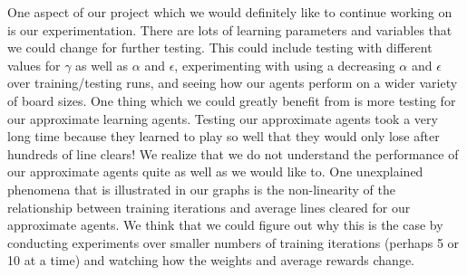 \documentclass[10pt]{article}
\begin{document}
\bigskip

One aspect of our project which we would definitely like to continue working on is our experimentation. There are lots of learning parameters and variables that we could change for further testing. This could include testing with different values for $\gamma$ as well as $\alpha$ and $\epsilon$, experimenting with using a decreasing $\alpha$ and $\epsilon$ over training/testing runs, and seeing how our agents perform on a wider variety of board sizes. One thing which we could greatly benefit from is more testing for our approximate learning agents. Testing our approximate agents took a very long time because they learned to play so well that they would only lose after hundreds of line clears! We realize that we do not understand the performance of our approximate agents quite as well as we would like to. One unexplained phenomena that is illustrated in our graphs is the non-linearity of the relationship between training iterations and average lines cleared for our approximate agents. We think that we could figure out why this is the case by conducting experiments over smaller numbers of training iterations (perhaps 5 or 10 at a time) and watching how the weights and average rewards change.

\bigskip
\end{document}
